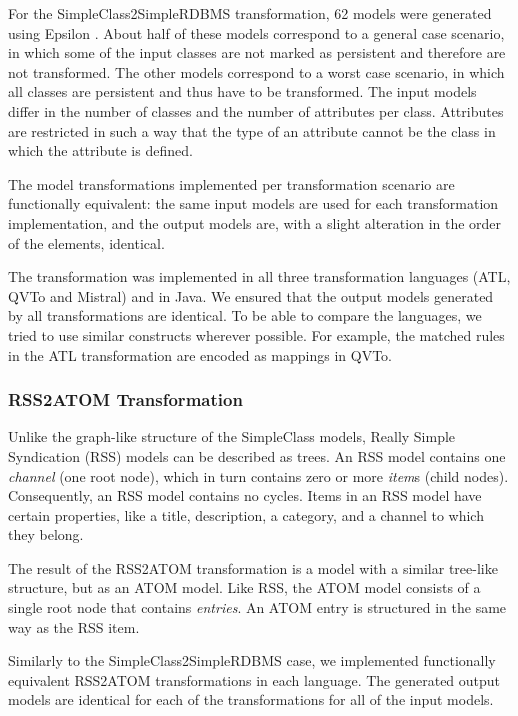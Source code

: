 \documentclass[12pt]{elsarticle}
\begin{document}
For the SimpleClass2SimpleRDBMS transformation, 62 models were generated using Epsilon
\cite{epsilon}. About half of these models correspond to a general case scenario,
in which some of the input classes are not marked as persistent and therefore
are not transformed. The other models correspond to a worst case scenario, in which
all classes are persistent and thus have to be transformed. The input models differ in
the number of classes and the number of attributes per class. Attributes are restricted
in such a way that the type of an attribute cannot be the class in which the attribute is defined.

The model transformations implemented per transformation scenario are
functionally equivalent: the same input models are used for each transformation
implementation, and the output models are, with a slight alteration in the order
of the elements, identical.

The transformation was implemented in all three transformation languages (ATL,
QVTo and Mistral) and in Java. We ensured that the output models generated by
all transformations are identical. To be able to compare the languages, we tried
to use similar constructs wherever possible. For example, the matched rules in the
ATL transformation are encoded as mappings in QVTo.

\subsubsection*{RSS2ATOM Transformation}

Unlike the graph-like structure of the SimpleClass models, Really Simple
Syndication (RSS) models can be described as trees. An RSS model
contains one \emph{channel} (one root node), which in turn contains zero or more
\emph{item}s (child nodes). Consequently, an RSS model contains no cycles.
Items in an RSS model have certain properties, like a title, description, a category, and a
channel to which they belong.

The result of the RSS2ATOM transformation is a model with a similar
tree-like structure, but as an ATOM model. Like RSS, the ATOM model
consists of a single root node that contains \emph{entries}. An ATOM entry is
structured in the same way as the RSS item.

Similarly to the SimpleClass2SimpleRDBMS case, we implemented functionally
equivalent RSS2ATOM transformations in each language. The generated output models
are identical for each of the transformations for all of the input models.
\end{document}
